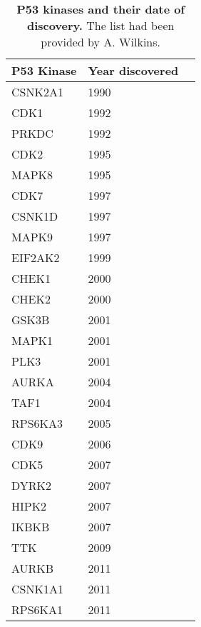 \documentclass[12pt,a4paper]{report}
\begin{document}
{{\begin{table*}
\begin{minipage}[c][\textheight]{\textwidth}
\centering
\vspace{-3in}
\setlength{\tabcolsep}{5pt} %
\renewcommand{\arraystretch}{0.5} %
\begin{tabular}{lll}
\textbf{P53 Kinase} & \textbf{Year discovered} \\ \hline
CSNK2A1    & 1990            \\ 
CDK1       & 1992            \\
PRKDC      & 1992            \\
CDK2       & 1995            \\
MAPK8      & 1995            \\
CDK7       & 1997            \\
CSNK1D     & 1997            \\
MAPK9      & 1997            \\
EIF2AK2    & 1999            \\
CHEK1      & 2000            \\
CHEK2      & 2000            \\
GSK3B      & 2001            \\
MAPK1      & 2001            \\
PLK3       & 2001            \\
AURKA      & 2004            \\
TAF1       & 2004            \\
RPS6KA3    & 2005            \\
CDK9       & 2006            \\
CDK5       & 2007            \\
DYRK2      & 2007            \\
HIPK2      & 2007            \\
IKBKB      & 2007            \\
TTK        & 2009           \\
AURKB      & 2011            \\
CSNK1A1      & 2011            \\
RPS6KA1        & 2011           \\ \hline
\end{tabular}
 \caption[List of P53 kinases and their date of discovery.]{\textbf{P53 kinases and their date of discovery.} The list had been provided by A. Wilkins.}
  \label{table:table_p53}
    \end{minipage}
\end{table*}

}}
\end{document}
